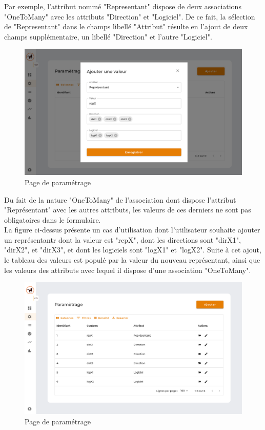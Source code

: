 \noindent Par exemple, l'attribut nommé "Representant" dispose de deux associations "OneToMany" avec les attributs "Direction" et "Logiciel". De ce fait, la sélection de "Representant" dans le champs libellé "Attribut" résulte en l'ajout de deux champs supplémentaire, un libellé "Direction" et l'autre "Logiciel". \\


\begin{figure}[H]
    \centering
    \includegraphics[width=\textwidth]{images/guis/parametrage/form-parent-attribute.png}
    \caption{Page de paramétrage}
\end{figure}

\noindent Du fait de la nature "OneToMany" de l'association dont dispose l'attribut "Représentant" avec les autres attributs, les valeurs de ces derniers ne sont pas obligatoires dans le formulaire. \\

\noindent La figure ci-dessus présente un cas d'utilisation dont l'utilisateur souhaite ajouter un représentantr dont la valeur est "repX", dont les directions sont "dirX1", "dirX2", et "dirX3", et dont les logiciels sont "logX1" et "logX2". Suite à cet ajout, le tableau des valeurs est populé par la valeur du nouveau représentant, ainsi que les valeurs des attributs avec lequel il dispose d'une association "OneToMany".




\clearpage

\begin{figure}[H]
    \centering
    \includegraphics[width=\textwidth]{images/guis/parametrage/table-post-parent-saved.png}
    \caption{Page de paramétrage}
\end{figure}



